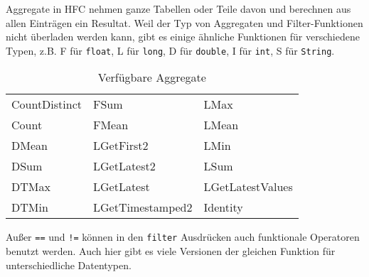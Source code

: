 Aggregate in HFC nehmen ganze Tabellen oder Teile davon und berechnen aus allen
Einträgen ein Resultat. Weil der Typ von Aggregaten und Filter-Funktionen nicht
überladen werden kann, gibt es einige ähnliche Funktionen für verschiedene
Typen, z.B. F für \texttt{float}, L für \texttt{long}, D für \texttt{double}, I
für \texttt{int}, S für \texttt{String}.

\begin{table}[h]
  \centering
 \begin{tabular}{lll}
   CountDistinct&  FSum&             LMax\\
   Count&          FMean&            LMean\\
   DMean&          LGetFirst2&       LMin\\
   DSum&           LGetLatest2&      LSum\\
   DTMax&          LGetLatest&       LGetLatestValues\\
   DTMin&          LGetTimestamped2& Identity     \\
 \end{tabular}
  \caption{Verfügbare Aggregate}
  \label{tab:hfcaggregates}
\end{table}

Außer \verb|==| und \verb|!=| können in den \texttt{filter} Ausdrücken
auch funktionale Operatoren benutzt werden. Auch hier gibt es viele
Versionen der gleichen Funktion für unterschiedliche Datentypen.

